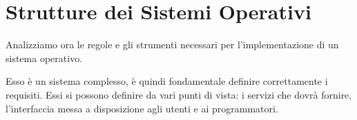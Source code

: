\chapter{Strutture dei Sistemi Operativi}
Analizziamo ora le regole e gli strumenti necessari per l'implementazione di un sistema operativo.

Esso è un sistema complesso, è quindi fondamentale definire correttamente i requisiti. Essi si possono definire da vari punti di vista: i servizi che dovrà fornire, l'interfaccia messa a disposizione agli utenti e ai programmatori.





